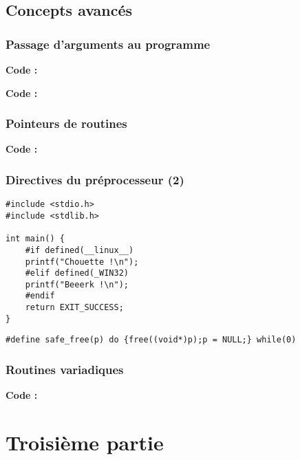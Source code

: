 \documentclass[../main.tex]{subfiles}
\begin{document}
\subsection{Concepts avancés}
\subsubsection{Passage d'arguments au programme}

\textbf{Code :} 


\textbf{Code :} 
\subsubsection{Pointeurs de routines}

\textbf{Code :} 
\subsubsection{Directives du préprocesseur (2)}
\begin{verbatim}
#include <stdio.h>
#include <stdlib.h>

int main() {
	#if defined(__linux__)
	printf("Chouette !\n");
	#elif defined(_WIN32)
	printf("Beeerk !\n");
	#endif
	return EXIT_SUCCESS;
}
\end{verbatim}
\begin{verbatim}
#define safe_free(p) do {free((void*)p);p = NULL;} while(0)
\end{verbatim}
\subsubsection{Routines variadiques}

\textbf{Code :} 
\section{Troisième partie}
\end{document}
